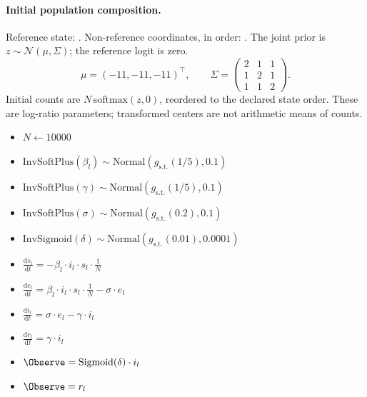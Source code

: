 \documentclass[11pt,letterpaper]{article}
\theoremstyle{plain}
\newcommand{\Sigmoid}{\textrm{Sigmoid}}
\newcommand{\InvSoftPlus}{\textrm{InvSoftPlus}}
\newcommand{\InvSigmoid}{\textrm{InvSigmoid}}
\newcommand{\Dist}[1]{\textrm{#1}}
\newcommand{\Evolve}[1]{\frac{\textrm{d}#1}{\textrm{d}t}}
\newcommand{\gst}{g_{\textrm{s.t.}}}
\begin{document}
{\paragraph{Initial population composition.}
Reference state: \texttt{}. Non-reference coordinates, in order: \texttt{}.
The joint prior is $z \sim \mathcal{N}(\mu,\Sigma)$; the reference logit is zero.
\[ \mu = (-11, -11, -11)^\top, \qquad \Sigma = \begin{pmatrix}2 & 1 & 1 \\ 1 & 2 & 1 \\ 1 & 1 & 2\end{pmatrix}. \]
Initial counts are $N\,\mathrm{softmax}(z,0)$, reordered to the declared state order.
These are log-ratio parameters; transformed centers are not arithmetic means of counts.

\begin{itemize}
\item $N \leftarrow 10000$  %
\item $\InvSoftPlus(\beta_{l}) \sim \Dist{Normal}(\gst(1/5),0.1)$
\item $\InvSoftPlus(\gamma) \sim \Dist{Normal}(\gst(1/5),0.1)$
\item $\InvSoftPlus(\sigma) \sim \Dist{Normal}(\gst(0.2),0.1)$
\item $\InvSigmoid(\delta) \sim \Dist{Normal}(\gst(0.01),0.0001)$ %
\item $\Evolve{s_l} = -\beta_{l} \cdot i_l \cdot s_l \cdot \frac{1}{N}$
\item $\Evolve{e_l} = \beta_{l} \cdot  i_l \cdot  s_l \cdot \frac{1}{N} - \sigma \cdot  e_l$
\item $\Evolve{i_l} = \sigma \cdot e_l - \gamma \cdot  i_l$
\item $\Evolve{r_l} = \gamma \cdot  i_l$
\item $\Observe = \Sigmoid( \delta ) \cdot i_l$ %
\item $\Observe = r_l$ %
\end{itemize}

}
\end{document}
